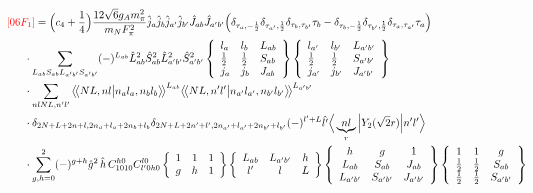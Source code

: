 \documentclass[master]{shnuthesis}
\newcommand{\llangle}{\big\langle\!\big\langle}
\newcommand{\rrangle}{\big\rangle\!\big\rangle}
\newcommand{\ap}{a^\prime}
\newcommand{\bp}{b^\prime}
\newcommand{\il}{\!\!\!\!\!\!\!\!\!\!}
\begin{document}
\begin{align}
    &\il {\color{red} [06F_1]} = \Big(c_4+\frac{1}{4}\Big)\frac{12\sqrt{6}g_A m_\pi^2}{m_N F_\pi^2} \hat{j}_a\hat{j}_b\hat{j}_{\ap}\hat{j}_{\bp}\hat{J}_{ab}\hat{J}_{\ap\bp} \Big( \delta_{\tau_a,-\frac{1}{2}}\delta_{\tau_{\ap},\frac{1}{2}}\delta_{\tau_b,\tau_{\bp}}\tau_b - \delta_{\tau_b,-\frac{1}{2}}\delta_{\tau_{\bp},\frac{1}{2}}\delta_{\tau_a,\tau_{\ap}}\tau_a \Big) \notag\\
    & \cdot \sum_{L_{ab}S_{ab}L_{\ap\bp}S_{\ap\bp}} (-)^{L_{ab}} \hat{L}_{ab}^2\hat{S}_{ab}^2\hat{L}_{\ap\bp}^2\hat{S}_{\ap\bp}^2  \left\{\begin{array}{lll}l_{a} & l_{b} & L_{ab} \\ \frac{1}{2} & \frac{1}{2} & S_{ab} \\j_{a} & j_{b} & J_{ab} \end{array}\right\} \left\{\begin{array}{lll}l_{\ap} & l_{\bp} & L_{\ap\bp} \\ \frac{1}{2} & \frac{1}{2} & S_{\ap\bp} \\j_{\ap} & j_{\bp} & J_{\ap\bp} \end{array}\right\}  \notag \\
    & \cdot \sum_{nlNL,n^\prime l^\prime} \llangle N L, n l \big| n_{a} l_{a}, n_{b} l_{b} \rrangle^{L_{ab}} \llangle N L, n^\prime l^\prime \big| n_{a^\prime} l_{a^\prime}, n_{b^\prime} l_{b^\prime} \rrangle^{L_{\ap\bp}} \notag\\
    & \cdot \delta_{2N+L+2n+l,2n_a+l_a+2n_b+l_b}\delta_{2N+L+2n^\prime+l^\prime,2n_{a^\prime}+l_{a^\prime}+2n_{b^\prime}+l_{b^\prime}} (-)^{l^\prime+L}\hat{l^\prime}\Big\langle \underbrace{n l}_{r} \Big| Y_2(\sqrt{2}r) \Big| n^\prime l^\prime \Big\rangle \notag\\
    & \cdot \sum_{g,h=0}^2 (-)^{g+h} \hat{g}^2\,\hat{h}\,  C_{1010}^{h0}C_{l^\prime 0 h 0}^{l0}  \left\{\begin{array}{ccc} 1 & 1 & 1 \\ g & h & 1 \end{array}\right\}  \left\{\begin{array}{ccc} L_{ab} & L_{\ap\bp} & h \\ l^\prime & l & L \end{array}\right\}  \left\{\begin{array}{ccc} h & g & 1 \\ L_{ab} & S_{ab} & J_{ab} \\ L_{\ap\bp} & S_{\ap\bp} & J_{\ap\bp} \end{array}\right\}  \left\{\begin{array}{ccc} 1 & 1 & g \\ \frac{1}{2} & \frac{1}{2} & S_{ab} \\ \frac{1}{2} & \frac{1}{2} & S_{\ap\bp} \end{array}\right\}  
\end{align}
\end{document}
